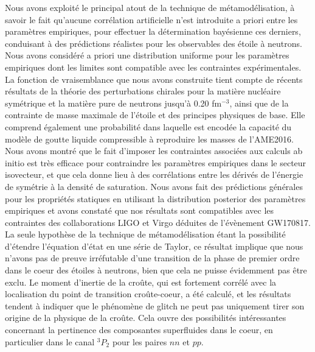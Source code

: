 Nous avons exploité le principal atout de la technique de métamodélisation, à 
savoir le fait qu'aucune corrélation artificielle n'est introduite a priori 
entre les paramètres empiriques, pour effectuer la détermination bayésienne ces
derniers, conduisant à des prédictions réalistes pour les observables des 
étoile à neutrons. Nous avons considéré a priori une distribution uniforme pour 
les paramètres empiriques dont les limites sont compatible avec les 
contraintes expérimentales. 
%
La fonction de vraisemblance que nous avons construite tient compte de 
récents résultats de la théorie des perturbations chirales pour la matière 
nucléaire symétrique et la matière pure de neutrons jusqu'à 0.20 fm$^{-3}$,
ainsi que de la contrainte de masse maximale de l'étoile et des principes
physiques de base. 
Elle comprend également une probabilité dans laquelle est encodée la capacité 
du modèle de goutte liquide compressible à reproduire les masses de l'AME2016. 
Nous avons montré que le fait d'imposer les contraintes 
associées aux calculs ab initio est très efficace pour contraindre les 
paramètres empiriques dans le secteur isovecteur, et que cela donne lieu à des 
corrélations entre les dérivés de l'énergie de symétrie à la densité de 
saturation.
Nous avons fait des prédictions générales pour les propriétés statiques en 
utilisant la distribution posterior des paramètres empiriques et avons constaté 
que nos résultats sont compatibles avec les contraintes des collaborations LIGO 
et Virgo déduites de l'évènement GW170817.
%
La seule hypothèse de la technique de métamodélisation étant la 
possibilité d'étendre l'équation d'état en une série de Taylor, ce résultat 
implique que nous n'avons pas de preuve irréfutable d'une transition de la 
phase de premier ordre dans le coeur des étoiles à neutrons, bien que cela
ne puisse évidemment pas être exclu.
%
Le moment d'inertie de la croûte, qui est fortement corrélé avec la 
localisation du point de transition croûte-coeur, a été calculé, et les
résultats tendent à indiquer que le phénomène de glitch ne peut pas uniquement
tirer son origine de la physique de la croûte. 
Cela ouvre des possibilités intéressantes concernant la pertinence des 
composantes superfluides dans le coeur, en particulier dans le canal $^3P_2$ 
pour les paires $nn$ et $pp$.

